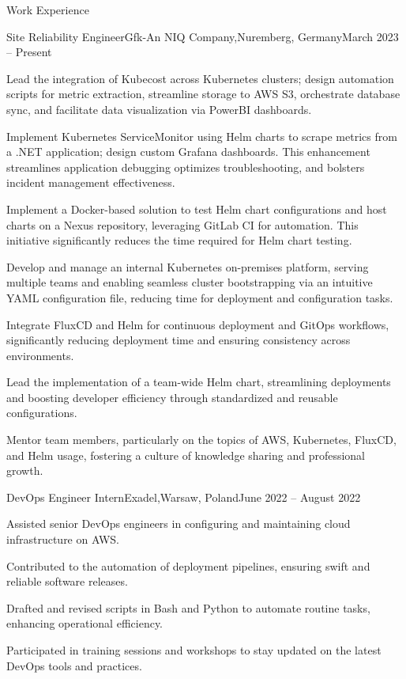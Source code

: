 \documentclass[a4paper]{article}
\newlength{\tabin}
\newlength{\secsep}
\newcommand{\lineunder}{\vspace*{-8pt}\\\hspace*{-6pt}\hrulefill\\\vspace*{-15pt}}
\newenvironment{tabbedsection}[1]{
  \begin{list}{}{
    \setlength{\itemsep}{0pt}
    \setlength{\labelsep}{0pt}
    \setlength{\labelwidth}{0pt}
    \setlength{\leftmargin}{\tabin}
    \setlength{\rightmargin}{\tabin}
    \setlength{\listparindent}{0pt}
    \setlength{\parsep}{0pt}
    \setlength{\parskip}{0pt}
    \setlength{\partopsep}{0pt}
    \setlength{\topsep}{#1}
  }
  \item[]
}{\end{list}}
\newenvironment{resume_section}[1]{
  \filbreak
  \vspace{2\secsep}
  \textsc{\large#1}
  \lineunder
  \begin{tabbedsection}{\secsep}
}{\end{tabbedsection}}
\newenvironment{subitems}{
  \renewcommand{\labelitemi}{-}
  \begin{itemize}
  \setlength{\labelsep}{1em}
}{\end{itemize}}
\newenvironment{resume_employer}[4]{
  \vspace{\secsep}
  \textbf{#1 \hfill #4} \\ 
  \textit{\small #2 #3}
  \begin{tabbedsection}{0pt}
  \begin{subitems}
}{\end{subitems}\end{tabbedsection}}
\begin{document}
\begin{resume_section}{Work Experience}
  \begin{resume_employer}{Site Reliability Engineer}{Gfk-An NIQ Company,}{Nuremberg, Germany}{March 2023 -- Present}
    \item Lead the integration of Kubecost across Kubernetes clusters; design automation scripts for metric extraction, streamline storage to AWS S3, orchestrate database sync, and facilitate data visualization via PowerBI dashboards.
    \item Implement Kubernetes ServiceMonitor using Helm charts to scrape metrics from a .NET application; design custom Grafana dashboards. This enhancement streamlines application debugging optimizes troubleshooting, and bolsters incident management effectiveness.
    \item Implement a Docker-based solution to test Helm chart configurations and host charts on a Nexus repository, leveraging GitLab CI for automation. This initiative significantly reduces the time required for Helm chart testing.
    \item Develop and manage an internal Kubernetes on-premises platform, serving multiple teams and enabling seamless cluster bootstrapping via an intuitive YAML configuration file, reducing time for deployment and configuration tasks.
    \item Integrate FluxCD and Helm for continuous deployment and GitOps workflows, significantly reducing deployment time and ensuring consistency across environments.
    \item Lead the implementation of a team-wide Helm chart, streamlining deployments and boosting developer efficiency through standardized and reusable configurations.
    \item Mentor team members, particularly on the topics of AWS, Kubernetes, FluxCD, and Helm usage, fostering a culture of knowledge sharing and professional growth.
  \end{resume_employer}

  \begin{resume_employer}{DevOps Engineer Intern}{Exadel,}{Warsaw, Poland}{June 2022 -- August 2022}
    \item Assisted senior DevOps engineers in configuring and maintaining cloud infrastructure on AWS.
    \item Contributed to the automation of deployment pipelines, ensuring swift and reliable software releases.
    \item Drafted and revised scripts in Bash and Python to automate routine tasks, enhancing operational efficiency.
    \item Participated in training sessions and workshops to stay updated on the latest DevOps tools and practices.
  \end{resume_employer}
\end{resume_section}
\end{document}
